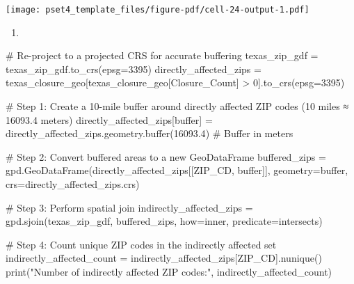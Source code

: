 \documentclass[
  letterpaper,
  DIV=11,
  numbers=noendperiod]{scrartcl}
\newenvironment{Shaded}{\begin{snugshade}}{\end{snugshade}}
\newcommand{\BuiltInTok}[1]{\textcolor[rgb]{0.00,0.23,0.31}{#1}}
\newcommand{\CommentTok}[1]{\textcolor[rgb]{0.37,0.37,0.37}{#1}}
\newcommand{\DecValTok}[1]{\textcolor[rgb]{0.68,0.00,0.00}{#1}}
\newcommand{\FloatTok}[1]{\textcolor[rgb]{0.68,0.00,0.00}{#1}}
\newcommand{\NormalTok}[1]{\textcolor[rgb]{0.00,0.23,0.31}{#1}}
\newcommand{\OperatorTok}[1]{\textcolor[rgb]{0.37,0.37,0.37}{#1}}
\newcommand{\StringTok}[1]{\textcolor[rgb]{0.13,0.47,0.30}{#1}}
\providecommand{\tightlist}{%
  \setlength{\itemsep}{0pt}\setlength{\parskip}{0pt}}\usepackage{longtable,booktabs,array}
\begin{document}
\texttt{[image: pset4\_template\_files/figure-pdf/cell-24-output-1.pdf]}

\begin{enumerate}
\def\labelenumi{\arabic{enumi}.}
\setcounter{enumi}{2}
\tightlist
\item
\end{enumerate}

\begin{Shaded}
\begin{Highlighting}[]
\CommentTok{\# Re{-}project to a projected CRS for accurate buffering}
\NormalTok{texas\_zip\_gdf }\OperatorTok{=}\NormalTok{ texas\_zip\_gdf.to\_crs(epsg}\OperatorTok{=}\DecValTok{3395}\NormalTok{)}
\NormalTok{directly\_affected\_zips }\OperatorTok{=}\NormalTok{ texas\_closure\_geo[texas\_closure\_geo[}\StringTok{\textquotesingle{}Closure\_Count\textquotesingle{}}\NormalTok{] }\OperatorTok{\textgreater{}} \DecValTok{0}\NormalTok{].to\_crs(epsg}\OperatorTok{=}\DecValTok{3395}\NormalTok{)}

\CommentTok{\# Step 1: Create a 10{-}mile buffer around directly affected ZIP codes (10 miles ≈ 16093.4 meters)}
\NormalTok{directly\_affected\_zips[}\StringTok{\textquotesingle{}buffer\textquotesingle{}}\NormalTok{] }\OperatorTok{=}\NormalTok{ directly\_affected\_zips.geometry.}\BuiltInTok{buffer}\NormalTok{(}\FloatTok{16093.4}\NormalTok{)  }\CommentTok{\# Buffer in meters}

\CommentTok{\# Step 2: Convert buffered areas to a new GeoDataFrame}
\NormalTok{buffered\_zips }\OperatorTok{=}\NormalTok{ gpd.GeoDataFrame(directly\_affected\_zips[[}\StringTok{\textquotesingle{}ZIP\_CD\textquotesingle{}}\NormalTok{, }\StringTok{\textquotesingle{}buffer\textquotesingle{}}\NormalTok{]], geometry}\OperatorTok{=}\StringTok{\textquotesingle{}buffer\textquotesingle{}}\NormalTok{, crs}\OperatorTok{=}\NormalTok{directly\_affected\_zips.crs)}

\CommentTok{\# Step 3: Perform spatial join }
\NormalTok{indirectly\_affected\_zips }\OperatorTok{=}\NormalTok{ gpd.sjoin(texas\_zip\_gdf, buffered\_zips, how}\OperatorTok{=}\StringTok{\textquotesingle{}inner\textquotesingle{}}\NormalTok{, predicate}\OperatorTok{=}\StringTok{\textquotesingle{}intersects\textquotesingle{}}\NormalTok{)}

\CommentTok{\# Step 4: Count unique ZIP codes in the indirectly affected set}
\NormalTok{indirectly\_affected\_count }\OperatorTok{=}\NormalTok{ indirectly\_affected\_zips[}\StringTok{\textquotesingle{}ZIP\_CD\textquotesingle{}}\NormalTok{].nunique()}
\BuiltInTok{print}\NormalTok{(}\StringTok{"Number of indirectly affected ZIP codes:"}\NormalTok{, indirectly\_affected\_count)}
\end{Highlighting}
\end{Shaded}
\end{document}
